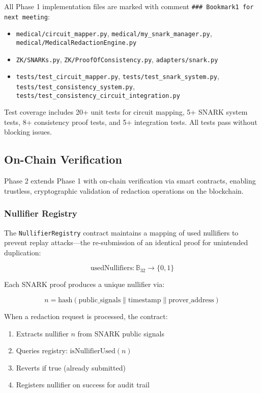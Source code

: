 All Phase 1 implementation files are marked with comment \texttt{\#\#\# Bookmark1 for next meeting}:
\begin{itemize}
    \item \texttt{medical/circuit\_mapper.py}, \texttt{medical/my\_snark\_manager.py}, \texttt{medical/MedicalRedactionEngine.py}
    \item \texttt{ZK/SNARKs.py}, \texttt{ZK/ProofOfConsistency.py}, \texttt{adapters/snark.py}
    \item \texttt{tests/test\_circuit\_mapper.py}, \texttt{tests/test\_snark\_system.py}, \texttt{tests/test\_consistency\_system.py}, \texttt{tests/test\_consistency\_circuit\_integration.py}
\end{itemize}

Test coverage includes 20+ unit tests for circuit mapping, 5+ SNARK system tests, 8+ consistency proof tests, and 5+ integration tests. All tests pass without blocking issues.

\subsection{On-Chain Verification}
\label{subsec:onchain_verification}

Phase 2 extends Phase 1 with on-chain verification via smart contracts, enabling trustless, cryptographic validation of redaction operations on the blockchain.

\subsubsection{Nullifier Registry}

The \texttt{NullifierRegistry} contract maintains a mapping of used nullifiers to prevent replay attacks---the re-submission of an identical proof for unintended duplication:

\begin{equation}
    \text{usedNullifiers}: \mathbb{B}_{32} \to \{0, 1\}
\end{equation}

Each SNARK proof produces a unique nullifier via:

\begin{equation}
    n = \text{hash}(\text{public\_signals} \| \text{timestamp} \| \text{prover\_address})
\end{equation}

When a redaction request is processed, the contract:
\begin{enumerate}
    \item Extracts nullifier $n$ from SNARK public signals
    \item Queries registry: $\text{isNullifierUsed}(n)$
    \item Reverts if true (already submitted)
    \item Registers nullifier on success for audit trail
\end{enumerate}

